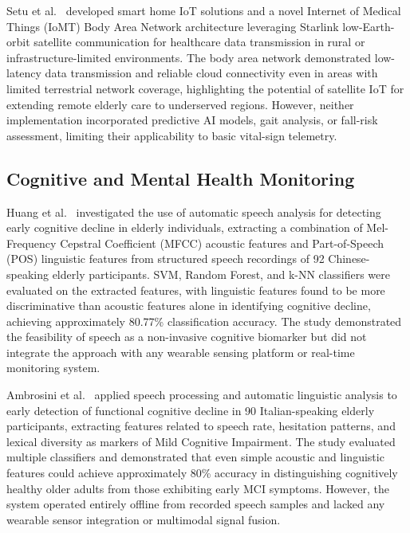 \documentclass[conference]{IEEEtran}
\begin{document}
Setu et al.~\cite{setu2024,setu2025} developed smart home IoT solutions
and a novel Internet of Medical Things (IoMT) Body Area Network
architecture leveraging Starlink low-Earth-orbit satellite communication
for healthcare data transmission in rural or infrastructure-limited
environments. The body area network demonstrated low-latency data
transmission and reliable cloud connectivity even in areas with limited
terrestrial network coverage, highlighting the potential of satellite
IoT for extending remote elderly care to underserved regions. However,
neither implementation incorporated predictive AI models, gait analysis,
or fall-risk assessment, limiting their applicability to basic vital-sign
telemetry.

\subsection{Cognitive and Mental Health Monitoring}

Huang et al.~\cite{huang2024} investigated the use of automatic speech
analysis for detecting early cognitive decline in elderly individuals,
extracting a combination of Mel-Frequency Cepstral Coefficient (MFCC)
acoustic features and Part-of-Speech (POS) linguistic features from
structured speech recordings of 92 Chinese-speaking elderly participants.
SVM, Random Forest, and k-NN classifiers were evaluated on the extracted
features, with linguistic features found to be more discriminative than
acoustic features alone in identifying cognitive decline, achieving
approximately 80.77\% classification accuracy. The study demonstrated the
feasibility of speech as a non-invasive cognitive biomarker but did not
integrate the approach with any wearable sensing platform or real-time
monitoring system.

Ambrosini et al.~\cite{ambrosini2019} applied speech processing and
automatic linguistic analysis to early detection of functional cognitive
decline in 90 Italian-speaking elderly participants, extracting features
related to speech rate, hesitation patterns, and lexical diversity as
markers of Mild Cognitive Impairment. The study evaluated multiple
classifiers and demonstrated that even simple acoustic and linguistic
features could achieve approximately 80\% accuracy in distinguishing
cognitively healthy older adults from those exhibiting early MCI symptoms.
However, the system operated entirely offline from recorded speech samples
and lacked any wearable sensor integration or multimodal signal fusion.
\end{document}
